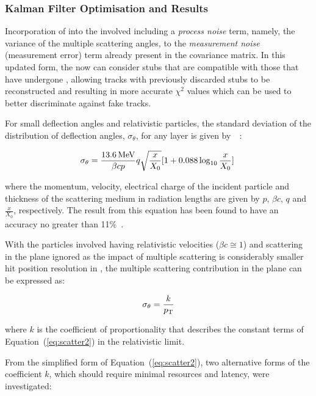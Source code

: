 \subsubsection{Kalman Filter Optimisation and Results}\label{subsubsec:lowPtOptKF}
Incorporation of \MS into the \KF involved including a \emph{process noise} term, namely, the variance of the multiple scattering angles, to the \emph{measurement noise} (\ie measurement error) term already present in the \KF covariance matrix.
In this updated form, the \KF now can consider stubs that are compatible with those that have undergone \MS, allowing tracks with previously discarded stubs to be reconstructed and resulting in more accurate $\chi^{2}$ values which can be used to better discriminate against fake tracks.

For small deflection angles and relativistic particles, the standard deviation of the distribution of deflection angles, $\sigma_{\theta}$, for any layer is given by~\cite{Lynch:1990sq}~:

\begin{equation}
\sigma_{\theta} = \frac{13.6\,\text{Me\hspace{-.08em}V}}{\beta c p} q \sqrt{\frac{x}{X_{0}}} [1 + 0.088 \log_{10}{\frac{x}{X_{0}}}]  \;
\label{eq:scatter1}
\end{equation}

where the momentum, velocity, electrical charge of the incident particle and thickness of the scattering medium in radiation lengths are given by $p$, $\beta c$, $q$ and $\frac{x}{X_{0}}$, respectively.
The result from this equation has been found to have an accuracy no greater than 11\%~\cite{Lynch:1990sq}.

With the particles involved having relativistic velocities (\ie $\beta c \cong 1$) and scattering in the \rz plane ignored as the impact of multiple scattering is considerably smaller hit position resolution in \rz, the multiple scattering contribution in the \rphi plane can be expressed as:

\begin{equation}
\sigma_{\theta} = \frac{k}{p_{\mathrm{T}}}
\label{eq:scatter2}
\end{equation}

where $k$ is the coefficient of proportionality that describes the constant terms of Equation~(\ref{eq:scatter2}) in the relativistic limit.

From the simplified form of Equation~(\ref{eq:scatter2}), two alternative forms of the coefficient $k$, which should require minimal resources and latency, were investigated:

